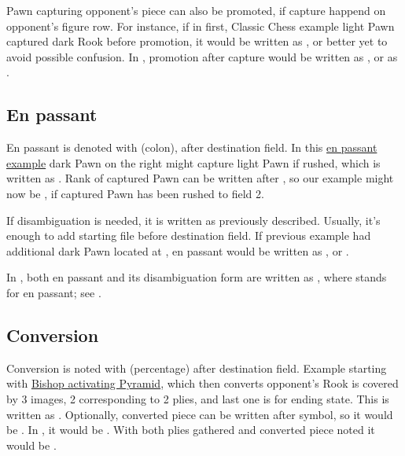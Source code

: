 Pawn capturing opponent's piece can also be promoted, if capture happend on opponent's
figure row. For instance, if in first, Classic Chess example light Pawn captured dark
Rook before promotion, it would be written as , or better yet 
to avoid possible confusion. In , promotion after capture would be written
as , or as .

\subsection*{En passant}
\label{sec:Appendix/Notation/En passant}

En passant is denoted with \alg{:} (colon), after destination field. In this
\hyperref[fig:04_croatian_ties_en_passant]{en passant example} dark Pawn on the right might
capture light Pawn if rushed, which is written as . Rank of captured Pawn can be
written after \alg{:}, so our example might now be , if captured Pawn has been
rushed to field 2.

If disambiguation is needed, it is written as previously described. Usually, it's enough to
add starting file before destination field. If previous example had additional dark Pawn
located at , en passant would be written as , or .

In , both en passant and its disambiguation form are written as
, where  stands for en passant; see .

\vfill

\subsection*{Conversion}
\label{sec:Appendix/Notation/Conversion}

Conversion is noted with \alg{\%} (percentage) after destination field. Example starting
with \hyperref[fig:scn_ma_08_conversion_init]{Bishop activating Pyramid}, which then converts
opponent's Rook is covered by 3 images, 2 corresponding to 2 plies, and last one is for ending
state. This is written as . Optionally, converted piece can be written after
\alg{\%} symbol, so it would be . In , it would be
. With both plies gathered and converted piece noted it would be
\alg{[Bh9-d5]\~{}[Ad5-h5\%R]}.

